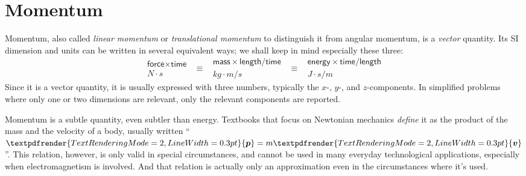 \documentclass[a4paper,12pt,%
onecolumn,oneside,titlepage,%
british%
]{memoir}
\renewcommand*{\bm}[1]{\textpdfrender{TextRenderingMode=2,LineWidth=0.3pt}{\boldsymbol{#1}}}
\newcommand{\mynotew}[1]{{\footnotesize\color{midgrey}\faIcon{tools}\ #1}}
\renewcommand*{\|}[1][]{\nonscript\:#1\vert\nonscript\:\mathopen{}}
\newcommand*{\sect}{\S}%
\begin{document}


\section{Momentum}
\label{sec:intro_momentum}

Momentum, also called \emph{linear momentum} or \emph{translational momentum} to distinguish it from angular momentum, is a \emph{vector} quantity. Its SI dimension and units can be written in several equivalent ways; we shall keep in mind especially these three:
\begin{equation*}
  \begin{gathered}
    \textsf{force}\times\textsf{time}
    \\\unit{N\cdot s}
  \end{gathered}
\enspace  \equiv\enspace
  \begin{gathered}
  \textsf{mass}\times\textsf{length}/\textsf{time}
    \\\unit{kg\cdot m/s}
  \end{gathered}
\enspace  \equiv\enspace
  \begin{gathered}
  \textsf{energy}\times\textsf{time}/\textsf{length}
    \\\unit{J\cdot s/m}
  \end{gathered}
\end{equation*}
Since it is a vector quantity, it is usually expressed with three numbers, typically the $x$-, $y$-, and $z$-components. In simplified problems where only one or two dimensions are relevant, only the relevant components are reported.

Momentum is a subtle quantity, even subtler than energy. Textbooks that focus on Newtonian mechanics \emph{define} it as the product of the mass and the velocity of a body, usually written \enquote{$\bm{p}=m\bm{v}$}. This relation, however, is only valid in special circumstances, and cannot be used in many everyday technological applications, especially when electromagnetism is involved. And that relation is actually only an approximation even in the circumstances where it's used.
\end{document}

